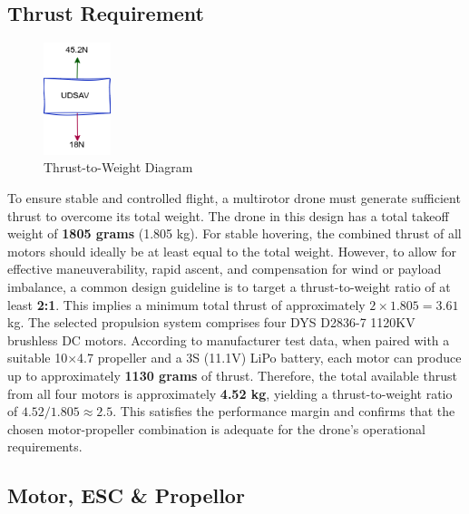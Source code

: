 \documentclass[12pt]{report}
\begin{document}
      \subsection{Thrust Requirement}
      \begin{figure}
        \includegraphics[width=0.175\textwidth]{thrust3.png}
        \caption{\small Thrust-to-Weight Diagram}
        \label{fig:thrustuas}
      \end{figure}
      
      To ensure stable and controlled flight, a multirotor drone must generate sufficient thrust to overcome its total weight. The drone in this design has a total takeoff weight of \textbf{1805 grams} (1.805 kg). For stable hovering, the combined thrust of all motors should ideally be at least equal to the total weight. However, to allow for effective maneuverability, rapid ascent, and compensation for wind or payload imbalance, a common design guideline is to target a thrust-to-weight ratio of at least \textbf{2:1}. This implies a minimum total thrust of approximately $2 \times 1.805 = 3.61$ kg. The selected propulsion system comprises four DYS D2836-7 1120KV brushless DC motors. According to manufacturer test data, when paired with a suitable 10$\times$4.7 propeller and a 3S (11.1V) LiPo battery, each motor can produce up to approximately \textbf{1130 grams} of thrust. Therefore, the total available thrust from all four motors is approximately \textbf{4.52 kg}, yielding a thrust-to-weight ratio of $4.52 / 1.805 \approx 2.5$. This satisfies the performance margin and confirms that the chosen motor-propeller combination is adequate for the drone's operational requirements.

      \subsection{Motor, ESC \& Propellor}
\end{document}
